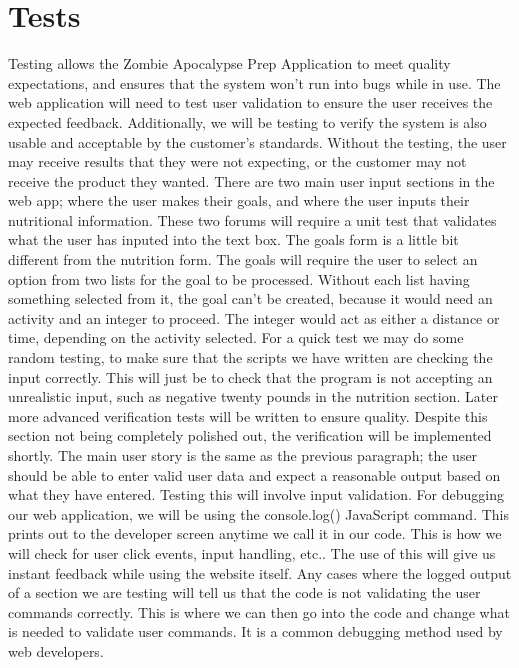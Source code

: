 \documentclass[a4paper]{article}
\begin{document}
\section{Tests}
Testing allows the Zombie Apocalypse Prep Application to meet quality expectations, and ensures that the system won't run into bugs while in use. The web application will need to test user validation to ensure the user receives the expected feedback. Additionally, we will be testing to verify the system is also usable and acceptable by the customer's standards.  Without the testing, the user may receive results that they were not expecting, or the customer may not receive the product they wanted. 
\newline
\newline
There are two main user input sections in the web app; where the user makes their goals, and where the user inputs their nutritional information. These two forums will require a unit test that validates what the user has inputed into the text box. The goals form is a little bit different from the nutrition form. The goals will require the user to select an option from two lists for the goal to be processed. Without each list having something selected from it, the goal can't be created, because it would need an activity and an integer to proceed. The integer would act as either a distance or time, depending on the activity selected.  For a quick test we may do some random testing, to make sure that the scripts we have written are checking the input correctly. This will just be to check that the program is not accepting an unrealistic input, such as negative twenty pounds in the nutrition section. Later more advanced verification tests will be written to ensure quality.  Despite this section not being completely polished out, the verification will be implemented shortly. 
\newline
\newline
The main user story is the same as the previous paragraph; the user should be able to enter valid user data and expect a reasonable output based on what they have entered. Testing this will involve input validation. 
\newline
\newline
For debugging our web application, we will be using the console.log() JavaScript command. This prints out to the developer screen anytime we call it in our code. This is how we will check for user click events, input handling, etc.. The use of this will give us instant feedback while using the website itself. Any cases where the logged output of a section we are testing will tell us that the code is not validating the user commands correctly. This is where we can then go into the code and change what is needed to validate user commands. It is a common debugging method used by web developers. 
\end{document}
